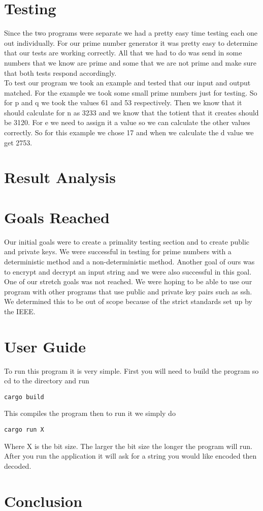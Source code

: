 \documentclass[12pt,journal,compsoc]{IEEEtran}
\begin{document}
\section{Testing}
Since the two programs were separate we had a pretty easy time testing each one out individually. 
For our prime number generator it was pretty easy to determine that our tests are working correctly. All that we had to do was send in some numbers that we know are prime and some that we are not prime and make sure that both tests respond accordingly. \\ \indent
To test our program we took an example and tested that our input and output matched. For the example we took some small prime numbers just for testing. So for p and q we took the values 61 and 53 respectively. Then we know that it should calculate for n as 3233 and we know that the totient that it creates should be 3120. For e we need to assign it a value so we can calculate the other values correctly. So for this example we chose 17 and when we calculate the d value we get 2753.  


\section{Result Analysis}

\section{Goals Reached}
Our initial goals were to create a primality testing section and to create public and private keys. We were successful in testing for prime numbers with a deterministic method and a non-deterministic method. Another goal of ours was to encrypt and decrypt an input string and we were also successful in this goal. \\ \indent One of our stretch goals was not reached. We were hoping to be able to use our program with other programs that use public and private key pairs such as ssh. We determined this to be out of scope because of the strict standards set up by the IEEE. 

\section{User Guide}
To run this program it is very simple. First you will need to build the program so cd to the directory and run 
\begin{lstlisting}[frame=single]
cargo build
\end{lstlisting} 
This compiles the program then to run it we simply do 
\begin{lstlisting}[frame=single]
cargo run X 
\end{lstlisting}
Where X is the bit size. The larger the bit size the longer the program will run. After you run the application it will ask for a string you would like encoded then decoded.

\section{Conclusion}


\appendices

\end{document}
